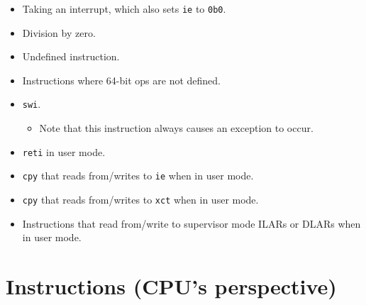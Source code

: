 \documentclass{article}
\begin{document}
	\begin{itemize}
	\item Taking an interrupt, which also sets \texttt{ie} to \texttt{0b0}.
	\item Division by zero.
	\item Undefined instruction.
	\item Instructions where 64-bit ops are not defined.
	\item \texttt{swi}.
		\begin{itemize}
		\item Note that this instruction always causes an exception to
		occur.
		\end{itemize}
	\item \texttt{reti} in user mode.
	\item \texttt{cpy} that reads from/writes to \texttt{ie} when in user
	mode.
	\item \texttt{cpy} that reads from/writes to \texttt{xct} when in user
	mode.
	\item Instructions that read from/write to supervisor mode
	ILARs or DLARs when in user mode.
	\end{itemize}
	\newpage

\section{Instructions (CPU's perspective)}
\end{document}
